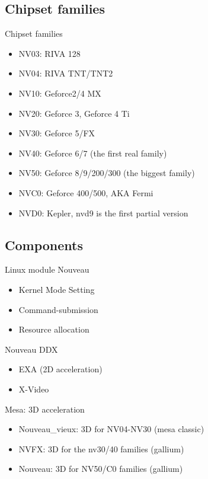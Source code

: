 \documentclass[11pt,english,compress]{beamer}
\begin{document}
	\subsection{Chipset families}
		\begin{frame}
			\begin{block}{Chipset families}
				\begin{itemize}
					\item NV03: RIVA 128
					\item NV04: RIVA TNT/TNT2
					\item NV10: Geforce2/4 MX
					\item NV20: Geforce 3, Geforce 4 Ti
					\item NV30: Geforce 5/FX
					\item NV40: Geforce 6/7 (the first real family) 
					\item NV50: Geforce 8/9/200/300 (the biggest family)
					\item NVC0: Geforce 400/500, AKA Fermi
					\item NVD0: Kepler, nvd9 is the first partial version
				\end{itemize}
			\end{block}
		\end{frame}

	\subsection{Components}
		\begin{frame}
			\begin{block}{Linux module Nouveau}
				\begin{itemize}
					\item Kernel Mode Setting
					\item Command-submission
					\item Resource allocation
				\end{itemize}
			\end{block}

			\begin{block}{Nouveau DDX}
				\begin{itemize}
					\item EXA (2D acceleration) 
					\item X-Video
				\end{itemize}
			\end{block}

			\begin{block}{Mesa: 3D acceleration}
				\begin{itemize}
					\item Nouveau\_vieux: 3D for NV04-NV30 (mesa classic)
					\item NVFX: 3D for the nv30/40 families (gallium)
					\item Nouveau: 3D for NV50/C0 families (gallium)
				\end{itemize}
			\end{block}
		\end{frame}
\end{document}
